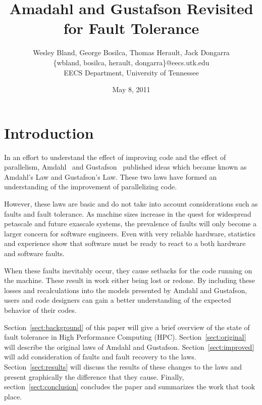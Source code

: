 \documentclass[]{article}
\begin{document}
\title{Amadahl and Gustafson Revisited for Fault Tolerance}
\author{Wesley Bland, George Bosilca, Thomas Herault, Jack Dongarra\\
		\{wbland, bosilca, herault, dongarra\}@eecs.utk.edu\\
		EECS Department, University of Tennessee}
\date{May 8, 2011}

\maketitle

\section{Introduction}
\label{sect:introduction}

In an effort to understand the effect of improving code and the effect of parallelism, Amdahl~\cite{Amdahl:1967up} and Gustafson~\cite{Gustafson:1988p6477} published ideas which became known as Amdahl's Law and Gustafson's Law. These two laws have formed an understanding of the improvement of parallelizing code.

However, these laws are basic and do not take into account considerations such as faults and fault tolerance. As machine sizes increase in the quest for widespread petascale and future exascale systems, the prevalence of faults will only become a larger concern for software engineers. Even with very reliable hardware, statistics and experience show that software must be ready to react to a both hardware and software faults.

When these faults inevitably occur, they cause setbacks for the code running on the machine. These result in work either being lost or redone. By including these losses and recalculations into the models presented by Amdahl and Gustafson, users and code designers can gain a better understanding of the expected behavior of their codes.

Section~\ref{sect:background} of this paper will give a brief overview of the state of fault tolerance in High Performance Computing (HPC). Section~\ref{sect:original} will describe the original laws of Amdahl and Gustafson. Section~\ref{sect:improved} will add consideration of faults and fault recovery to the laws. Section~\ref{sect:results} will discuss the results of these changes to the laws and present graphically the difference that they cause. Finally, section~\ref{sect:conclusion} concludes the paper and summarizes the work that took place.
\end{document}
